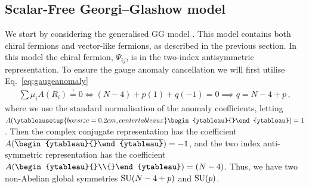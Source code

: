 \subsection{Scalar-Free Georgi--Glashow model}
We start by considering the generalised GG model \cite{Georgi:1974yf}. This model contains both chiral fermions and vector-like fermions, as described in the previous section. In this model the chiral fermion, $\Psi_{ij}$, is in the two-index antisymmetric representation.  To ensure the gauge anomaly cancellation we will first utilise Eq.~\eqref{eq:gaugeanomaly}
\begin{align}
    \sum \mu_i A(R_i)\overset{!}{=}0 \Longleftrightarrow (N-4)+p(1)+q(-1)=0\implies q=N-4+p\,,\label{eq:anomSU}
\end{align}
where we use the standard normalisation of the anomaly coefficients, letting $A(\ytableausetup{boxsize=0.2cm, centertableaux}\begin{ytableau}{}\end{ytableau})=1$. Then the complex conjugate representation has the coefficient $A(\overline{\begin{ytableau}{}\end{ytableau}\rule{0pt}{6.5pt}})=-1$, and the two index anti-symmetric representation has the coefficient $A(\begin{ytableau}{}\\{}\end{ytableau})=(N-4)$. Thus, we have two non-Abelian global symmetries $\mathrm{SU}(N-4+p)$ and $\mathrm{SU}(p)$. 

